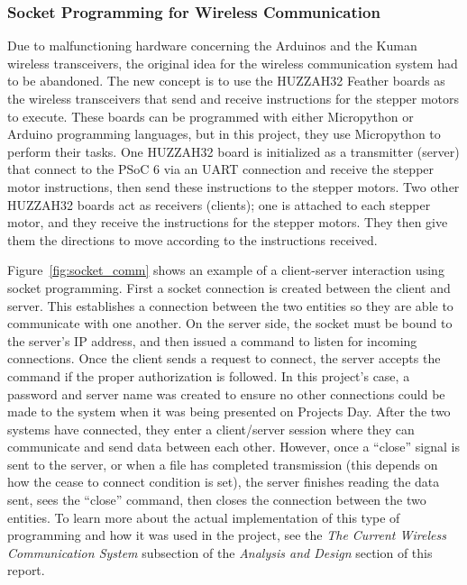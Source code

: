 \subsubsection{Socket Programming for Wireless Communication}
 Due to malfunctioning hardware concerning the Arduinos and the Kuman wireless transceivers, the original idea for the wireless communication system had to be abandoned. The new concept is to use the HUZZAH32 Feather boards as the wireless transceivers that send and receive instructions for the stepper motors to execute. These boards can be programmed with either Micropython or Arduino programming languages, but in this project, they use Micropython to perform their tasks. One HUZZAH32 board is initialized as a transmitter (server) that connect to the PSoC 6 via an UART connection and receive the stepper motor instructions, then send these instructions to the stepper motors. Two other HUZZAH32 boards act as receivers (clients); one is attached to each stepper motor, and they receive the instructions for the stepper motors. They then give them the directions to move according to the instructions received. \par
 \setlength{\parindent}{2.5ex}
 Figure~\ref{fig:socket_comm} shows an example of a client-server interaction using socket programming. First a socket connection is created between the client and server. This establishes a connection between the two entities so they are able to communicate with one another. On the server side, the socket must be bound to the server's IP address, and then issued a command to listen for incoming connections. Once the client sends a request to connect, the server accepts the command if the proper authorization is followed. In this project's case, a password and server name was created to ensure no other connections could be made to the system when it was being presented on Projects Day. After the two systems have connected, they enter a client/server session where they can communicate and send data between each other. However, once a ``close'' signal is sent to the server, or when a file has completed transmission (this depends on how the cease to connect condition is set), the server finishes reading the data sent, sees the ``close'' command, then closes the connection between the two entities. To learn more about the actual implementation of this type of programming and how it was used in the project, see the \textit{The Current Wireless Communication System} subsection of the \textit{Analysis and Design} section of this report.
 
